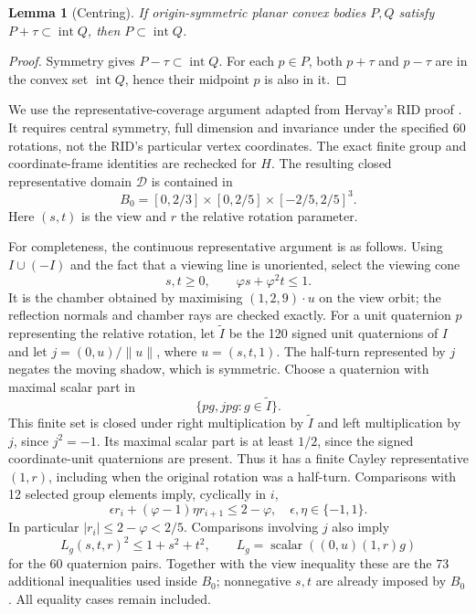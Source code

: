 \documentclass[11pt,a4paper]{article}
\newtheorem{lemma}[theorem]{Lemma}
\newcommand{\intr}{\operatorname{int}}
\newcommand{\HH}{H}
\begin{document}
\begin{lemma}[Centring]
If origin-symmetric planar convex bodies $P,Q$ satisfy $P+\tau\subset\intr Q$,
then $P\subset\intr Q$.
\end{lemma}
\begin{proof}
Symmetry gives $P-\tau\subset\intr Q$. For each $p\in P$, both $p+\tau$ and $p-\tau$
are in the convex set $\intr Q$, hence their midpoint $p$ is also in it.
\end{proof}

We use the representative-coverage argument adapted from Hervay's RID proof
\cite{Hervay}. It requires central symmetry, full dimension and invariance under
the specified 60 rotations, not the RID's particular vertex coordinates.
The exact finite group and coordinate-frame identities are rechecked for $\HH$.
The resulting closed representative domain $\mathcal D$ is contained in
\begin{equation}\label{eq:B0}
 B_0=[0,2/3]\times[0,2/5]\times[-2/5,2/5]^3.
\end{equation}
Here $(s,t)$ is the view and $r$ the relative rotation parameter.

For completeness, the continuous representative argument is as follows.
Using $I\cup(-I)$ and the fact that a viewing line is unoriented, select the
viewing cone
\[
 s,t\ge0,\qquad \varphi s+\varphi^2t\le1.
\]
It is the chamber obtained by maximising $(1,2,9)\cdot u$ on the view orbit;
the reflection normals and chamber rays are checked exactly. For a unit
quaternion $p$ representing the relative rotation, let $\widetilde I$ be the
120 signed unit quaternions of $I$ and let $j=(0,u)/\|u\|$, where $u=(s,t,1)$.
The half-turn represented by $j$ negates the moving shadow, which is symmetric.
Choose a quaternion with maximal scalar part in
\[
 \{pg,jpg:g\in\widetilde I\}.
\]
This finite set is closed under right multiplication by $\widetilde I$ and
left multiplication by $j$, since $j^2=-1$. Its maximal scalar part is at
least $1/2$, since the signed coordinate-unit
quaternions are present. Thus it has a finite Cayley representative $(1,r)$,
including when the original rotation was a half-turn. Comparisons with
12 selected group elements imply, cyclically in $i$,
\[
 \epsilon r_i+(\varphi-1)\eta r_{i+1}\le2-\varphi,
 \quad \epsilon,\eta\in\{-1,1\}.
\]
In particular $|r_i|\le2-\varphi<2/5$. Comparisons involving $j$ also imply
\[
 L_g(s,t,r)^2\le1+s^2+t^2,\qquad
 L_g=\operatorname{scalar}((0,u)(1,r)g)
\]
for the 60 quaternion pairs. Together with the view inequality these are the
73 additional inequalities used inside $B_0$; nonnegative $s,t$ are already
imposed by $B_0$. All equality cases remain included.
\end{document}
